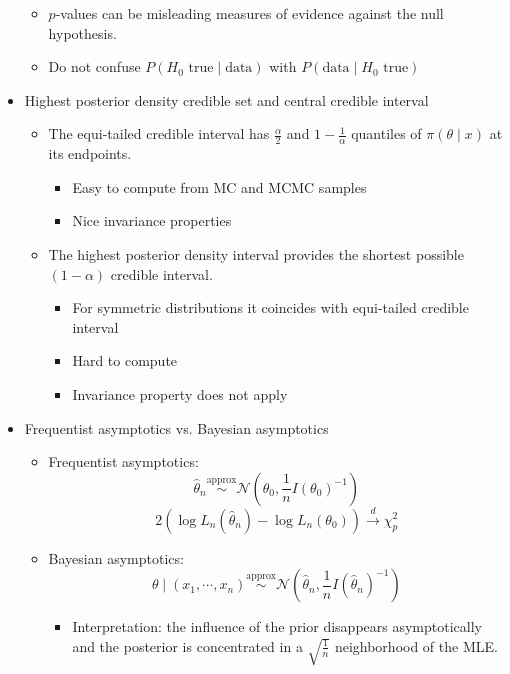 \documentclass[a4paper]{article}
\begin{document}
\begin{itemize}
\begin{itemize}
        \item $p$-values can be misleading measures of evidence against the null hypothesis.
        \item Do not confuse $P(H_0\text{ true}\mid \text{data})$ with $P(\text{data}\mid H_0\text{ true})$
    \end{itemize}
    \item Highest posterior density credible set and central credible interval
    \begin{itemize}
        \item The equi-tailed credible interval has $\frac{\alpha}{2}$ and $1-\frac{1}{\alpha}$ quantiles of $\pi(\theta\mid x)$ at its endpoints.
        \begin{itemize}
            \item Easy to compute from MC and MCMC samples
            \item Nice invariance properties
        \end{itemize}
        \item The highest posterior density interval provides the shortest possible $(1-\alpha)$ credible interval.
        \begin{itemize}
            \item For symmetric distributions it coincides with equi-tailed credible interval
            \item Hard to compute
            \item Invariance property does not apply
        \end{itemize}
    \end{itemize}
    \item Frequentist asymptotics vs. Bayesian asymptotics
    \begin{itemize}
        \item Frequentist asymptotics:
        \[\widehat{\theta}_n\overset{\text{approx}}{\sim}\mathcal{N}\left(\theta_0, \frac{1}{n}I(\theta_0)^{-1} \right) \]
        \[2\left(\log L_n(\widehat{\theta}_n)-\log L_n(\theta_0) \right)\overset{d}{\to}\chi_p^2 \]
        \item Bayesian asymptotics:
        \[\theta\mid(x_1,\cdots,x_n)\overset{\text{approx}}{\sim}\mathcal{N}\left(\widehat{\theta}_n,\frac{1}{n}I(\widehat{\theta}_n)^{-1} \right) \]
        \begin{itemize}
            \item Interpretation: the influence of the prior disappears asymptotically and the posterior is concentrated in a $\sqrt{\frac{1}{n}}$ neighborhood of the MLE.

\end{itemize}
\end{itemize}
\end{itemize}
\end{document}
